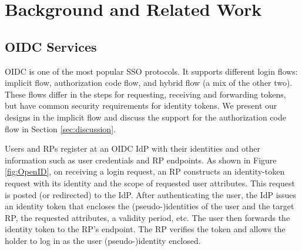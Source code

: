 \section{Background and Related Work}
\label{sec:background}

\subsection{OIDC Services}
\label{subsec:OIDC}
OIDC is one of the most popular SSO protocols. It supports different login flows: implicit flow, authorization code flow, and hybrid flow (a mix of the other two). These flows differ in the steps for requesting, receiving and forwarding tokens, but have common security requirements for identity tokens.
We present our designs in the implicit flow and discuss the support for the authorization code flow in Section \ref{sec:discussion}.

Users and RPs register at an OIDC IdP with their identities
and other information such as user credentials %
and RP endpoints. %
As shown in Figure \ref{fig:OpenID}, on receiving a login request, an RP constructs an identity-token request with its identity and the scope of requested user attributes.
This request is posted (or redirected) to the IdP.
After authenticating the user, the IdP issues an identity token that encloses the (pseudo-)identities of the user and the target RP, the requested attributes, a validity period, etc. The user then forwards the identity token to the RP's endpoint. The RP verifies the token and allows the holder to log in as the user (pseudo-)identity enclosed.

